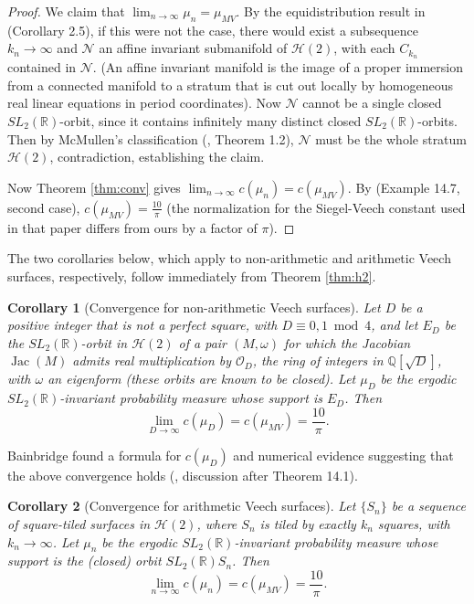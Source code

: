 \documentclass{article}
\newtheorem{cor}{Corollary}[section]
\theoremstyle{definition}
\begin{document}
\begin{proof}
We claim that $\lim_{n\to\infty} \mu_n = \mu_{MV}$.  By the equidistribution result in \cite{emm2015} (Corollary 2.5), if this were not the case, there would exist a subsequence $k_n \to \infty$ and $\mathcal{N}$ an affine invariant submanifold of $\mathcal{H}(2)$, with each $C_{k_n}$ contained in $\mathcal{N}$.  (An affine invariant manifold is the image of a proper immersion from a connected manifold to a stratum that is cut out locally by homogeneous real linear equations in period coordinates).  Now $\mathcal{N}$ cannot be a single closed $SL_2(\mathbb{R})$-orbit, since it contains infinitely many distinct closed $SL_2(\mathbb{R})$-orbits.  Then by McMullen's classification (\cite{mcmullen2007}, Theorem 1.2), $\mathcal{N}$ must be the whole stratum $\mathcal{H}(2)$, contradiction, establishing the claim.

Now Theorem \ref{thm:conv} gives $\lim_{n\to\infty} c(\mu_n) = c(\mu_{MV})$.  By \cite{emz2003} (Example 14.7, second case), $c(\mu_{MV})=\frac{10}{\pi}$ (the normalization for the Siegel-Veech constant used in that paper differs from ours by a factor of $\pi$).  

\end{proof}


The two corollaries below, which apply to non-arithmetic and arithmetic Veech surfaces, respectively, follow immediately from Theorem \ref{thm:h2}.  

\begin{cor}[Convergence for non-arithmetic Veech surfaces]
  Let $D$ be a positive integer that is not a perfect square, with $D\equiv 0,1 \bmod 4$, and let $E_D$ be the $SL_2(\mathbb{R})$-orbit in $\mathcal{H}(2)$ of a pair $(M,\omega)$ for which the Jacobian $\operatorname{Jac}(M)$ admits real multiplication by $\mathcal{O}_D$, the ring of integers in $\mathbb{Q}[\sqrt{D}]$, with $\omega$ an eigenform (these orbits are known to be closed).  Let $\mu_D$ be the ergodic $SL_2(\mathbb{R})$-invariant probability measure whose support is $E_D$.  Then 
$$\lim_{D\to\infty} c(\mu_D) =c(\mu_{MV})=\frac{10}{\pi}.$$
\end{cor}

Bainbridge found a formula for $c(\mu_D)$ and numerical evidence suggesting that the above convergence holds (\cite{bainbridge2007}, discussion after Theorem 14.1).  

\begin{cor}[Convergence for arithmetic Veech surfaces]
  Let $\{S_n\}$ be a sequence of square-tiled surfaces in $\mathcal{H}(2)$, where $S_n$ is tiled by exactly $k_n$ squares, with $k_n\to\infty$.  Let $\mu_n$ be the ergodic $SL_2(\mathbb{R})$-invariant probability measure whose support is the (closed) orbit $SL_2(\mathbb{R})S_n$.  Then 
$$\lim_{n\to\infty} c(\mu_n) = c(\mu_{MV}) = \frac{10}{\pi}.$$
\end{cor}
\end{document}
